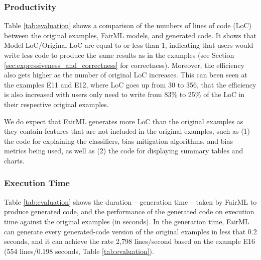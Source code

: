 \documentclass[sigconf,review]{acmart}
\begin{document}
{%
	
	
	
	
	\subsubsection{Productivity}
	\label{sec:productivity}
	
	Table \ref{tab:evaluation} shows a comparison of the numbers of lines of code (LoC) between the original examples, FairML models, and generated code. It shows that \textsf{Model LoC}/\textsf{Original LoC} are equal to or less than 1, indicating that users would write less code to produce the same results as in the examples (see Section \ref{sec:expressiveness_and_correctness} for correctness). Moreover, the efficiency also gets higher as the number of original LoC increases. This can been seen at the examples \textsf{E11} and \textsf{E12}, where LoC goes up from 30 to 356, that the efficiency is also increased with users only need to write from 83\% to 25\% of the LoC in their respective original examples.
	
	We do expect that FairML generates more LoC than the original examples as they contain features that are not included in the original examples, such as (1) the code for explaining the classifiers, bias mitigation algorithms, and bias metrics being used, as well as (2) the code for displaying summary tables and charts. 
	
	
	
	
	\subsubsection{Execution Time}
	\label{sec:execution_time}
	
	Table \ref{tab:evaluation} shows the duration -- generation time -- taken by FairML to produce generated code, 
	and the performance of the generated code on execution time against the original examples (in seconds). 
	In the generation time, 
	FairML can generate every generated-code version of the original examples in less that 0.2 seconds, 
	and it can achieve the rate 2,798 lines/second based on the example E16 
	(554 lines/0.198 seconds, Table \ref{tab:evaluation}). 
	
}
\end{document}
